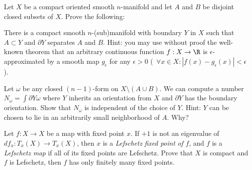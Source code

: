 Let $X$ be a compact oriented smooth $n$-manifold and let $A$ and $B$
be disjoint closed subsets of $X$. Prove the following:
\begin{alist}
\item There is a compact smooth $n$-(sub)manifold with boundary 
$Y$ in $X$ such that $A\subset Y$ and $\partial Y$ separates $A$ and
$B$. Hint: you may use without proof the well-known theorem that an
arbitrary continuous function $f:X\rightarrow \R$ is
$\epsilon$-approximated by a smooth map $g_{\epsilon}$ for any
$\epsilon>0$ (\ie\ $\forall x\in X: |f(x)-g_{\epsilon}(x)|<\epsilon$).
\item Let $\omega$ be any closed $(n-1)$-form on $X\setminus (A\cup
B)$. We can compute a number $N_{\omega}=\int{\partial Y}\omega$ where
$Y$ inherits an orientation from $X$ and $\partial Y$ has the boundary
orientation. Show that $N_{\omega}$ is independent of the choice of
$Y$. Hint: $Y$ can be chosen to lie in an arbitrarily small
neighborhood of $A$. Why?
\item Let $f:X\rightarrow X$ be a map with fixed point $x$. If $+1$ is
not an eigenvalue of $df_x:T_x(X)\rightarrow T_x(X)$, then $x$ is a
\emph{Lefschetz fixed point of $f$}, and $f$ is a \emph{Lefschetz map}
if all of its fixed points are Lefschetz. Prove that $X$ is compact
and $f$ is Lefschetz, then $f$ has only finitely many fixed points.
\end{alist}
